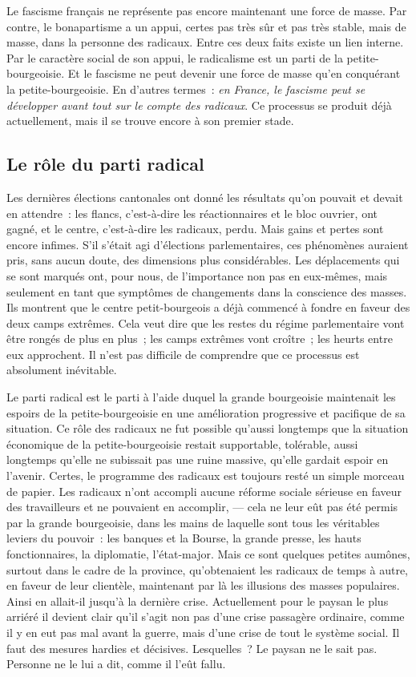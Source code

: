 \documentclass[french,twoside]{book} %
\begin{document}
Le fascisme français ne représente pas encore maintenant une force de masse. Par contre, le bonapartisme a un appui, certes pas très sûr et pas très stable, mais de masse, dans la personne des radicaux. Entre ces deux faits existe un lien interne. Par le caractère social de son appui, le radicalisme est un parti de la petite-bourgeoisie. Et le fascisme ne peut devenir une force de masse qu’en conquérant la petite-bourgeoisie. En d’autres termes : \emph{en France, le fascisme peut se développer avant tout sur le compte des radicaux}. Ce processus se produit déjà actuellement, mais il se trouve encore à son premier stade.
\subsection[{Le rôle du parti radical}]{Le rôle du parti radical}
\noindent Les dernières élections cantonales ont donné les résultats qu’on pouvait et devait en attendre : les flancs, c’est-à-dire les réactionnaires et le bloc ouvrier, ont gagné, et le centre, c’est-à-dire les radicaux, perdu. Mais gains et pertes sont encore infimes. S’il s’était agi d’élections parlementaires, ces phénomènes auraient pris, sans aucun doute, des dimensions plus considérables. Les déplacements qui se sont marqués ont, pour nous, de l’importance non pas en eux-mêmes, mais seulement en tant que symptômes de changements dans la conscience des masses. Ils montrent que le centre petit-bourgeois a déjà commencé à fondre en faveur des deux camps extrêmes. Cela veut dire que les restes du régime parlementaire vont être rongés de plus en plus ; les camps extrêmes vont croître ; les heurts entre eux approchent. Il n’est pas difficile de comprendre que ce processus est absolument inévitable.\par
 Le parti radical est le parti à l’aide duquel la grande bourgeoisie maintenait les espoirs de la petite-bourgeoisie en une amélioration progressive et pacifique de sa situation. Ce rôle des radicaux ne fut possible qu’aussi longtemps que la situation économique de la petite-bourgeoisie restait supportable, tolérable, aussi longtemps qu’elle ne subissait pas une ruine massive, qu’elle gardait espoir en l’avenir. Certes, le programme des radicaux est toujours resté un simple morceau de papier. Les radicaux n’ont accompli aucune réforme sociale sérieuse en faveur des travailleurs et ne pouvaient en accomplir, — cela ne leur eût pas été permis par la grande bourgeoisie, dans les mains de laquelle sont tous les véritables leviers du pouvoir : les banques et la Bourse, la grande presse, les hauts fonctionnaires, la diplomatie, l’état-major. Mais ce sont quelques petites aumônes, surtout dans le cadre de la province, qu’obtenaient les radicaux de temps à autre, en faveur de leur clientèle, maintenant par là les illusions des masses populaires. Ainsi en allait-il jusqu’à la dernière crise. Actuellement pour le paysan le plus arriéré il devient clair qu’il s’agit non pas d’une crise passagère ordinaire, comme il y en eut pas mal avant la guerre, mais d’une crise de tout le système social. Il faut des mesures hardies et décisives. Lesquelles ? Le paysan ne le sait pas. Personne ne le lui a dit, comme il l’eût fallu.\par
\end{document}
